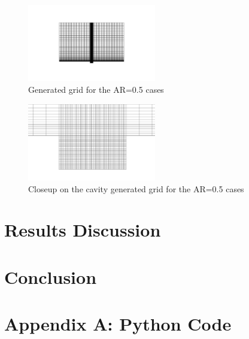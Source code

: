 \documentclass[twocolumn,10pt]{asme2ej}
\begin{document}
\begin{figure}[tb]
\begin{center}
\includegraphics[width=0.5\textwidth]{figure/grid.png}
\caption{Generated grid for the AR=0.5 cases}
\label{grid_figure}
\end{center}
\end{figure}

\begin{figure}[tb]
\begin{center}
\includegraphics[width=0.5\textwidth]{figure/tight_grid.png}
\caption{Closeup on the cavity generated grid for the AR=0.5 cases}
\label{grid_figure}
\end{center}
\end{figure}

\section{Results Discussion}

\section{Conclusion}

\nocite{*}



\clearpage
\onecolumn
\appendix       %
\section*{Appendix A: Python Code}




\end{document}
